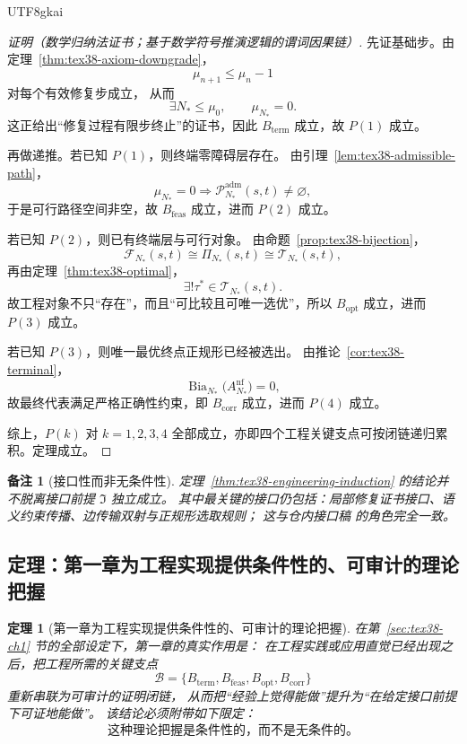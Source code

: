 \documentclass[12pt]{article}
\newtheorem{theorem}{定理}[section]
\newtheorem{remark}{备注}[section]
\newcommand{\Bia}{\operatorname{Bia}}
\begin{document}
\begin{CJK*}{UTF8}{gkai}
\begin{proof}[证明（数学归纳法证书；基于数学符号推演逻辑的谓词因果链）]
先证基础步。由定理~\ref{thm:tex38-axiom-downgrade}，
\[
  \mu_{n+1}\le\mu_n-1
\]
对每个有效修复步成立，
从而
\[
  \exists N_\ast\le\mu_0,\qquad \mu_{N_\ast}=0.
\]
这正给出“修复过程有限步终止”的证书，因此 $B_{\mathrm{term}}$ 成立，故 $P(1)$ 成立。

再做递推。若已知 $P(1)$，则终端零障碍层存在。
由引理~\ref{lem:tex38-admissible-path}，
\[
  \mu_{N_\ast}=0
  \Longrightarrow
  \mathcal{P}_{N_\ast}^{\mathrm{adm}}(s,t)\neq\varnothing,
\]
于是可行路径空间非空，故 $B_{\mathrm{feas}}$ 成立，进而 $P(2)$ 成立。

若已知 $P(2)$，则已有终端层与可行对象。
由命题~\ref{prop:tex38-bijection}，
\[
  \mathcal{F}_{N_\ast}(s,t)
  \cong
  \Pi_{N_\ast}(s,t)
  \cong
  \mathcal{T}_{N_\ast}(s,t),
\]
再由定理~\ref{thm:tex38-optimal}，
\[
  \exists!\tau^\ast\in\mathcal{T}_{N_\ast}(s,t).
\]
故工程对象不只“存在”，而且“可比较且可唯一选优”，所以 $B_{\mathrm{opt}}$ 成立，进而 $P(3)$ 成立。

若已知 $P(3)$，则唯一最优终点正规形已经被选出。
由推论~\ref{cor:tex38-terminal}，
\[
  \Bia_{N_\ast}\bigl(A_{N_\ast}^{\mathrm{nf}}\bigr)=0,
\]
故最终代表满足严格正确性约束，即 $B_{\mathrm{corr}}$ 成立，进而 $P(4)$ 成立。

综上，$P(k)$ 对 $k=1,2,3,4$ 全部成立，亦即四个工程关键支点可按闭链递归累积。定理成立。
\end{proof}

\begin{remark}[接口性而非无条件性]
定理~\ref{thm:tex38-engineering-induction} 的结论并不脱离接口前提 $\mathfrak{I}$ 独立成立。
其中最关键的接口仍包括：局部修复证书接口、语义约束传播、边传输双射与正规形选取规则；
这与仓内接口稿
\cite{RepoTex20SemanticGaugeNormalization,RepoTex31RepairTower,RepoTex32ConditionalConvergence,
  RepoTex36HomotopyTwistBijection}
的角色完全一致。
\end{remark}

\subsection{定理：第一章为工程实现提供条件性的、可审计的理论把握}
\label{subsec:tex38-engineering-theorem}

\begin{theorem}[第一章为工程实现提供条件性的、可审计的理论把握]
\label{thm:tex38-engineering-role}
在第~\ref{sec:tex38-ch1} 节的全部设定下，第一章的真实作用是：
在工程实践或应用直觉已经出现之后，把工程所需的关键支点
\[
  \mathcal{B}
  =
  \{B_{\mathrm{term}},B_{\mathrm{feas}},B_{\mathrm{opt}},B_{\mathrm{corr}}\}
\]
重新串联为可审计的证明闭链，
从而把“经验上觉得能做”提升为“在给定接口前提下可证地能做”。
该结论必须附带如下限定：
\[
  \text{这种理论把握是条件性的，而不是无条件的。}
\]
\end{theorem}


\end{CJK*}
\end{document}
